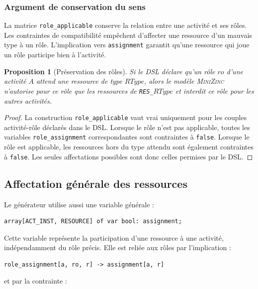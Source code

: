 \documentclass[12pt,a4paper]{article}
\newtheorem{proposition}{Proposition}[section]
\newcommand{\MZN}{\textsc{MiniZinc}}
\begin{document}
\subsubsection*{Argument de conservation du sens}

La matrice \texttt{role\_applicable} conserve la relation entre une activité et ses rôles. Les contraintes de compatibilité empêchent d'affecter une ressource d'un mauvais type à un rôle. L'implication vers \texttt{assignment} garantit qu'une ressource qui joue un rôle participe bien à l'activité.

\begin{proposition}[Préservation des rôles]
Si le DSL déclare qu'un rôle $ro$ d'une activité $A$ attend une ressource de type $RType$, alors le modèle \MZN{} n'autorise pour ce rôle que les ressources de \texttt{RES\_$RType$} et interdit ce rôle pour les autres activités.
\end{proposition}

\begin{proof}
La construction \texttt{role\_applicable} vaut vrai uniquement pour les couples activité-rôle déclarés dans le DSL. Lorsque le rôle n'est pas applicable, toutes les variables \texttt{role\_assignment} correspondantes sont contraintes à \texttt{false}. Lorsque le rôle est applicable, les ressources hors du type attendu sont également contraintes à \texttt{false}. Les seules affectations possibles sont donc celles permises par le DSL.
\end{proof}

\subsection{Affectation générale des ressources}

Le générateur utilise aussi une variable générale :

\begin{lstlisting}[language=MiniZinc]
array[ACT_INST, RESOURCE] of var bool: assignment;
\end{lstlisting}

Cette variable représente la participation d'une ressource à une activité, indépendamment du rôle précis. Elle est reliée aux rôles par l'implication :

\begin{lstlisting}[language=MiniZinc]
role_assignment[a, ro, r] -> assignment[a, r]
\end{lstlisting}

et par la contrainte :
\end{document}
